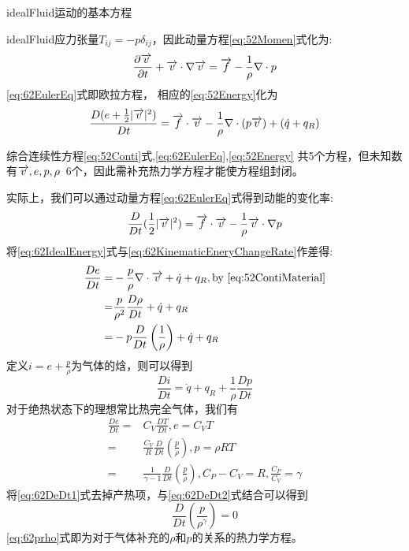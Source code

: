 
\gls{idealFluid}运动的基本方程

\gls{idealFluid}应力张量$T_{ij}=-p\delta_{ij}$，因此动量方程\eqref{eq:52Momen}式化为:
\begin{equation}\label{eq:62EulerEq}
 \frac{\partial \overrightarrow{v}}{\partial t}+\overrightarrow{v}\cdot\nabla\overrightarrow{v}=\overrightarrow{f}-\frac{1}{\rho}\nabla\cdot p
\end{equation}
\eqref{eq:62EulerEq}式即欧拉方程，
相应的\eqref{eq:52Energy}化为
\begin{equation}\label{eq:62IdealEnergy}
 \frac{D(e+\frac{1}{2}|\overrightarrow{v}|^2)}{Dt}=
 \overrightarrow{f}\cdot\overrightarrow{v}-\frac{1}{\rho}\nabla\cdot(p\overrightarrow{v})+(\dot{q}+q_R) 
\end{equation}

综合连续性方程\eqref{eq:52Conti}式,\eqref{eq:62EulerEq},\eqref{eq:52Energy}
共5个方程，但未知数有$\overrightarrow{v},e,p,\rho\,$ 6个，因此需补充热力学方程才能使方程组封闭。

实际上，我们可以通过动量方程\eqref{eq:62EulerEq}式得到动能的变化率:
\begin{equation}\label{eq:62KinematicEneryChangeRate}
\frac{D}{D t}(\frac{1}{2}|\overrightarrow{v}|^2)=\overrightarrow{f}\cdot \overrightarrow{v}-\frac{1}{\rho}\overrightarrow{v}\cdot\nabla p
\end{equation}
将\eqref{eq:62IdealEnergy}式与\eqref{eq:62KinematicEneryChangeRate}作差得:
\begin{align}
\frac{De}{Dt}= & -\frac{p}{\rho} \nabla \cdot \overrightarrow{v} + \dot{q}+q_R ,\text{by }\eqref{eq:52ContiMaterial}\nonumber\\
=& \frac{p}{\rho^2}\frac{D\rho}{Dt} + \dot{q}+q_R \nonumber\\
=& -p\frac{D}{Dt}\left(\frac{1}{\rho}\right) + \dot{q}+q_R\label{eq:62DeDt1}
\end{align}
定义$i=e+\frac{p}{\rho}$为气体的焓，则可以得到
\begin{equation}
\frac{D i}{D t}=\dot{q}+q_R + \frac{1}{\rho} \frac{D p }{D t}
\end{equation}
对于绝热状态下的理想常比热完全气体，我们有
\begin{align}
\frac{D e}{D t}=& C_V \frac{D T}{D t},e=C_V T\nonumber\\
=& \frac{C_V}{R} \frac{D}{D t}\left(\frac{p}{\rho}\right),p=\rho RT\nonumber\\
=& \frac{1}{\gamma -1} \frac{D}{D t}\left(\frac{p}{\rho}\right),C_P-C_V=R,\frac{C_P}{C_V}=\gamma \label{eq:62DeDt2}
\end{align}
将\eqref{eq:62DeDt1}式去掉产热项，与\eqref{eq:62DeDt2}式结合可以得到
\begin{equation}\label{eq:62prho}
\frac{D}{D t}\left(\frac{p}{\rho^{\gamma}}\right)=0
\end{equation}
\eqref{eq:62prho}式即为对于气体补充的$\rho$和$p$的关系的热力学方程。

